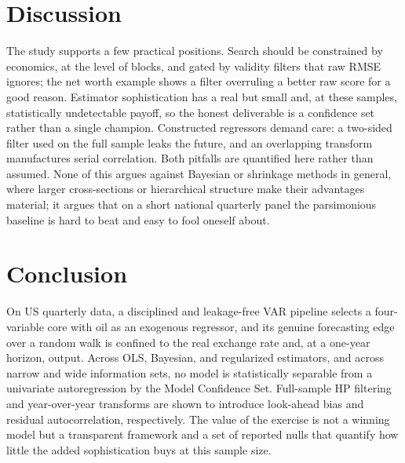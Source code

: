 \documentclass[conference]{IEEEtran}
\begin{document}
\section{Discussion}
The study supports a few practical positions. Search should be constrained by economics, at the level of blocks, and gated by validity filters that raw RMSE ignores; the net worth example shows a filter overruling a better raw score for a good reason. Estimator sophistication has a real but small and, at these samples, statistically undetectable payoff, so the honest deliverable is a confidence set rather than a single champion. Constructed regressors demand care: a two-sided filter used on the full sample leaks the future, and an overlapping transform manufactures serial correlation. Both pitfalls are quantified here rather than assumed. None of this argues against Bayesian or shrinkage methods in general, where larger cross-sections or hierarchical structure make their advantages material; it argues that on a short national quarterly panel the parsimonious baseline is hard to beat and easy to fool oneself about.

\section{Conclusion}
On US quarterly data, a disciplined and leakage-free VAR pipeline selects a four-variable core with oil as an exogenous regressor, and its genuine forecasting edge over a random walk is confined to the real exchange rate and, at a one-year horizon, output. Across OLS, Bayesian, and regularized estimators, and across narrow and wide information sets, no model is statistically separable from a univariate autoregression by the Model Confidence Set. Full-sample HP filtering and year-over-year transforms are shown to introduce look-ahead bias and residual autocorrelation, respectively. The value of the exercise is not a winning model but a transparent framework and a set of reported nulls that quantify how little the added sophistication buys at this sample size.
\end{document}
